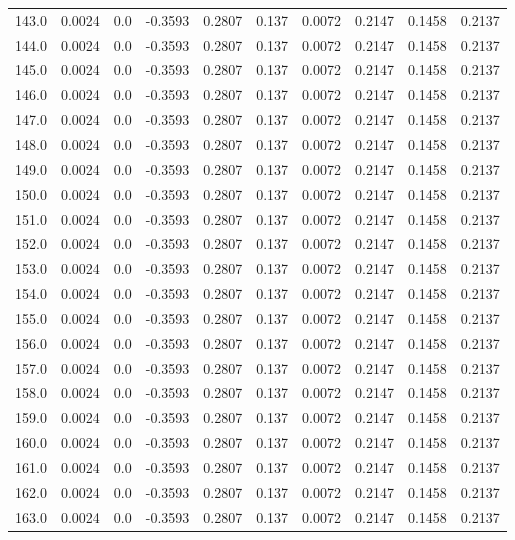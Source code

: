 \begin{longtable}{lrrrrrrrrr}
143.0 & 0.0024 & 0.0 & -0.3593 & 0.2807 & 0.137 & 0.0072 & 0.2147 & 0.1458 & 0.2137 \\
144.0 & 0.0024 & 0.0 & -0.3593 & 0.2807 & 0.137 & 0.0072 & 0.2147 & 0.1458 & 0.2137 \\
145.0 & 0.0024 & 0.0 & -0.3593 & 0.2807 & 0.137 & 0.0072 & 0.2147 & 0.1458 & 0.2137 \\
146.0 & 0.0024 & 0.0 & -0.3593 & 0.2807 & 0.137 & 0.0072 & 0.2147 & 0.1458 & 0.2137 \\
147.0 & 0.0024 & 0.0 & -0.3593 & 0.2807 & 0.137 & 0.0072 & 0.2147 & 0.1458 & 0.2137 \\
148.0 & 0.0024 & 0.0 & -0.3593 & 0.2807 & 0.137 & 0.0072 & 0.2147 & 0.1458 & 0.2137 \\
149.0 & 0.0024 & 0.0 & -0.3593 & 0.2807 & 0.137 & 0.0072 & 0.2147 & 0.1458 & 0.2137 \\
150.0 & 0.0024 & 0.0 & -0.3593 & 0.2807 & 0.137 & 0.0072 & 0.2147 & 0.1458 & 0.2137 \\
151.0 & 0.0024 & 0.0 & -0.3593 & 0.2807 & 0.137 & 0.0072 & 0.2147 & 0.1458 & 0.2137 \\
152.0 & 0.0024 & 0.0 & -0.3593 & 0.2807 & 0.137 & 0.0072 & 0.2147 & 0.1458 & 0.2137 \\
153.0 & 0.0024 & 0.0 & -0.3593 & 0.2807 & 0.137 & 0.0072 & 0.2147 & 0.1458 & 0.2137 \\
154.0 & 0.0024 & 0.0 & -0.3593 & 0.2807 & 0.137 & 0.0072 & 0.2147 & 0.1458 & 0.2137 \\
155.0 & 0.0024 & 0.0 & -0.3593 & 0.2807 & 0.137 & 0.0072 & 0.2147 & 0.1458 & 0.2137 \\
156.0 & 0.0024 & 0.0 & -0.3593 & 0.2807 & 0.137 & 0.0072 & 0.2147 & 0.1458 & 0.2137 \\
157.0 & 0.0024 & 0.0 & -0.3593 & 0.2807 & 0.137 & 0.0072 & 0.2147 & 0.1458 & 0.2137 \\
158.0 & 0.0024 & 0.0 & -0.3593 & 0.2807 & 0.137 & 0.0072 & 0.2147 & 0.1458 & 0.2137 \\
159.0 & 0.0024 & 0.0 & -0.3593 & 0.2807 & 0.137 & 0.0072 & 0.2147 & 0.1458 & 0.2137 \\
160.0 & 0.0024 & 0.0 & -0.3593 & 0.2807 & 0.137 & 0.0072 & 0.2147 & 0.1458 & 0.2137 \\
161.0 & 0.0024 & 0.0 & -0.3593 & 0.2807 & 0.137 & 0.0072 & 0.2147 & 0.1458 & 0.2137 \\
162.0 & 0.0024 & 0.0 & -0.3593 & 0.2807 & 0.137 & 0.0072 & 0.2147 & 0.1458 & 0.2137 \\
163.0 & 0.0024 & 0.0 & -0.3593 & 0.2807 & 0.137 & 0.0072 & 0.2147 & 0.1458 & 0.2137 \\

\end{longtable}
